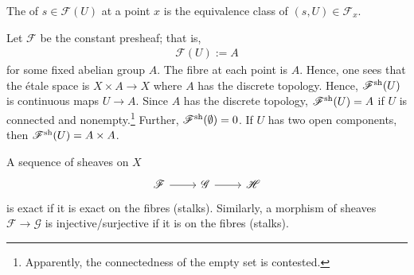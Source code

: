 \documentclass [11 pt, oneside, margin = 1 in] {article}
\begin{document}
\begin{definition}[ ]\label{}\text{}
The  of $s\in \mathscr{F}(U)$ at a point $x$ is the equivalence class of $(s,U) \in  \mathscr{F}_x$.
\end{definition}

\begin{example}[Sheafification]\label{}\text{}
Let $\mathscr{F}$ be the constant presheaf; that is,
\begin{align*}
	\mathscr{F}(U) := A
\end{align*}
for some fixed abelian group $A$. The fibre at each point is $A$. Hence, one sees that the \'etale space is $X\times A \longrightarrow X$ where $A$ has the discrete topology. Hence, $\mathscr{F}\textsuperscript{sh}(U)$ is continuous maps $U\longrightarrow A$. Since $A$ has the discrete topology, $\mathscr{F}\textsuperscript{sh}(U)=A$ if $U$ is connected and nonempty.\footnote{Apparently, the connectedness of the empty set is contested.} Further, $\mathscr{F}\textsuperscript{sh}(\emptyset ) = 0$. If $U$ has two open components, then $\mathscr{F}\textsuperscript{sh}(U) = A\times A$. 
\end{example}

A sequence of sheaves on $X$
\[
\begin{tikzcd}
	\mathscr{F} \ar[r] &\mathscr{G}\ar[r] &\mathscr{H}
\end{tikzcd}
\]
is exact if it is exact on the fibres (stalks). Similarly, a morphism of sheaves $\mathscr{F}\longrightarrow \mathscr{G}$ is injective/surjective if it is on the fibres (stalks).
\end{document}
